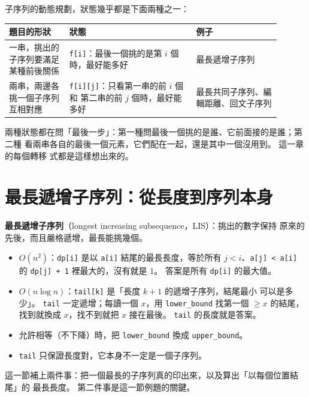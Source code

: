 子序列的動態規劃，狀態幾乎都是下面兩種之一：

\begin{center}
\begin{tabular}{p{0.2\linewidth}p{0.42\linewidth}p{0.28\linewidth}}
\toprule
題目的形狀 & 狀態 & 例子 \\
\midrule
一串，挑出的子序列要滿足某種前後關係 & \texttt{f[i]}：最後一個挑的是第 $i$
個時，最好能多好 & 最長遞增子序列 \\
兩串，兩邊各挑一個子序列互相對應 & \texttt{f[i][j]}：只看第一串的前 $i$ 個和
第二串的前 $j$ 個時，最好能多好 & 最長共同子序列、編輯距離、回文子序列 \\
\bottomrule
\end{tabular}
\end{center}

兩種狀態都在問「最後一步」：第一種問最後一個挑的是誰、它前面接的是誰；第二種
看兩串各自的最後一個元素，它們配在一起，還是其中一個沒用到。 這一章的每個轉移
式都是這樣想出來的。

\section{最長遞增子序列：從長度到序列本身}
\label{sec:ss-lis}

\begin{bridgerecap}
\textbf{最長遞增子序列}（longest increasing subsequence，LIS）：挑出的數字保持
原來的先後，而且嚴格遞增，最長能挑幾個。
\begin{itemize}
\item $O(n^2)$：\texttt{dp[i]} 是以 \texttt{a[i]} 結尾的最長長度，等於所有
$j < i$、\texttt{a[j] < a[i]} 的 \texttt{dp[j] + 1} 裡最大的，沒有就是 $1$。
答案是所有 \texttt{dp[i]} 的最大值。
\item $O(n \log n)$：\texttt{tail[k]} 是「長度 $k + 1$ 的遞增子序列，結尾最小
可以是多少」。 \texttt{tail} 一定遞增；每讀一個 $x$，用
\texttt{lower\_bound} 找第一個 $\ge x$ 的結尾，找到就換成 $x$，找不到就把 $x$
接在最後。 \texttt{tail} 的長度就是答案。
\item 允許相等（不下降）時，把 \texttt{lower\_bound} 換成 \texttt{upper\_bound}。
\item \texttt{tail} 只保證長度對，它本身不一定是一個子序列。
\end{itemize}
\end{bridgerecap}

這一節補上兩件事：把一個最長的子序列真的印出來，以及算出「以每個位置結尾」的
最長長度。 第二件事是這一節例題的關鍵。

